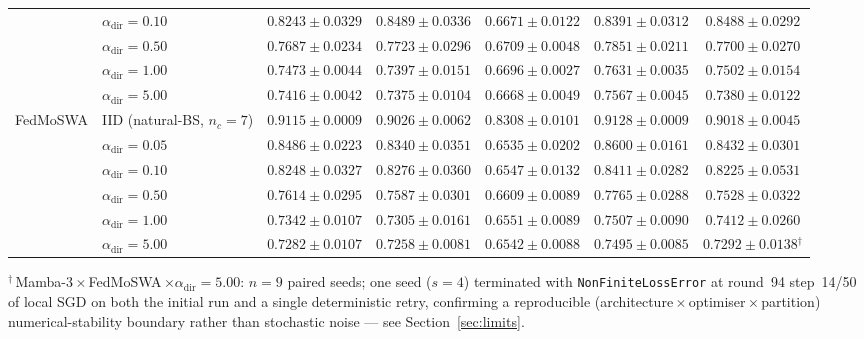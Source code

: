\documentclass[journal]{IEEEtran}
\newcommand{\alphadir}{\ensuremath{\alpha_{\mathrm{dir}}}}
\begin{document}
\begin{table}[t]
\begin{tabular}{@{}llccccc@{}}
 & $\alphadir{=}0.10$ & $0.8243{\pm}0.0329$ & $\mathbf{0.8489{\pm}0.0336}$ & $0.6671{\pm}0.0122$ & $0.8391{\pm}0.0312$ & $0.8488{\pm}0.0292$ \\
 & $\alphadir{=}0.50$ & $0.7687{\pm}0.0234$ & $0.7723{\pm}0.0296$ & $0.6709{\pm}0.0048$ & $\mathbf{0.7851{\pm}0.0211}$ & $0.7700{\pm}0.0270$ \\
 & $\alphadir{=}1.00$ & $0.7473{\pm}0.0044$ & $0.7397{\pm}0.0151$ & $0.6696{\pm}0.0027$ & $\mathbf{0.7631{\pm}0.0035}$ & $0.7502{\pm}0.0154$ \\
 & $\alphadir{=}5.00$ & $0.7416{\pm}0.0042$ & $0.7375{\pm}0.0104$ & $0.6668{\pm}0.0049$ & $\mathbf{0.7567{\pm}0.0045}$ & $0.7380{\pm}0.0122$ \\
\midrule
FedMoSWA & IID (natural-BS, $n_c{=}7$) & $0.9115{\pm}0.0009$ & $0.9026{\pm}0.0062$ & $0.8308{\pm}0.0101$ & $\mathbf{0.9128{\pm}0.0009}$ & $0.9018{\pm}0.0045$ \\
 & $\alphadir{=}0.05$ & $0.8486{\pm}0.0223$ & $0.8340{\pm}0.0351$ & $0.6535{\pm}0.0202$ & $\mathbf{0.8600{\pm}0.0161}$ & $0.8432{\pm}0.0301$ \\
 & $\alphadir{=}0.10$ & $0.8248{\pm}0.0327$ & $0.8276{\pm}0.0360$ & $0.6547{\pm}0.0132$ & $\mathbf{0.8411{\pm}0.0282}$ & $0.8225{\pm}0.0531$ \\
 & $\alphadir{=}0.50$ & $0.7614{\pm}0.0295$ & $0.7587{\pm}0.0301$ & $0.6609{\pm}0.0089$ & $\mathbf{0.7765{\pm}0.0288}$ & $0.7528{\pm}0.0322$ \\
 & $\alphadir{=}1.00$ & $0.7342{\pm}0.0107$ & $0.7305{\pm}0.0161$ & $0.6551{\pm}0.0089$ & $\mathbf{0.7507{\pm}0.0090}$ & $0.7412{\pm}0.0260$ \\
 & $\alphadir{=}5.00$ & $0.7282{\pm}0.0107$ & $0.7258{\pm}0.0081$ & $0.6542{\pm}0.0088$ & $\mathbf{0.7495{\pm}0.0085}$ & $0.7292{\pm}0.0138$$^{\dag}$ \\
\bottomrule
\end{tabular}
\par\smallskip
{\footnotesize $^{\dag}$\,Mamba-3\,$\times$\,FedMoSWA\,$\times\alphadir{=}5.00$: $n{=}9$ paired seeds; one seed ($s{=}4$) terminated with \texttt{NonFiniteLossError} at round~94 step~14/50 of local SGD on both the initial run and a single deterministic retry, confirming a reproducible (architecture\,$\times$\,optimiser\,$\times$\,partition) numerical-stability boundary rather than stochastic noise --- see Section~\ref{sec:limits}.}
\end{table}
\end{document}
